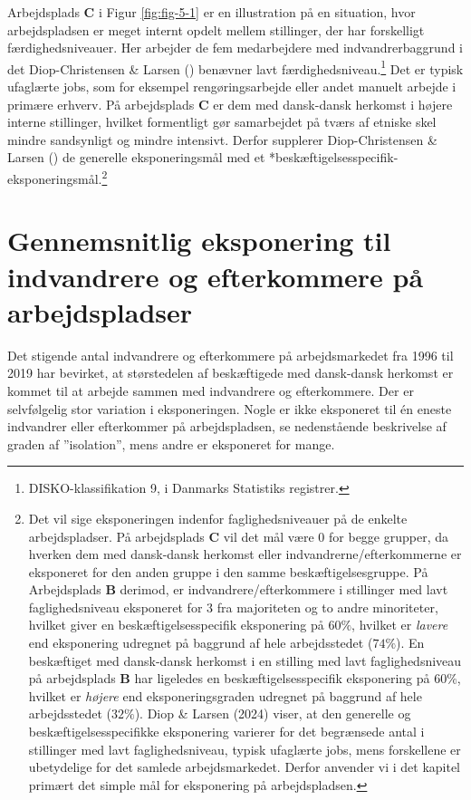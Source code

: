 \documentclass[
]{book}
\begin{document}
Arbejdsplads \textbf{C} i Figur \ref{fig:fig-5-1} er en illustration på en situation, hvor arbejdspladsen er meget internt opdelt mellem stillinger, der har forskelligt færdighedsniveauer. Her arbejder de fem medarbejdere med indvandrerbaggrund i det Diop-Christensen \& Larsen () benævner lavt færdighedsniveau.\footnote{DISKO-klassifikation 9, i Danmarks Statistiks registrer.} Det er typisk ufaglærte jobs, som for eksempel rengøringsarbejde eller andet manuelt arbejde i primære erhverv. På arbejdsplads \textbf{C} er dem med dansk-dansk herkomst i højere interne stillinger, hvilket formentligt gør samarbejdet på tværs af etniske skel mindre sandsynligt og mindre intensivt. Derfor supplerer Diop-Christensen \& Larsen () de generelle eksponeringsmål med et *beskæftigelsesspecifik-eksponeringsmål.\footnote{Det vil sige eksponeringen indenfor faglighedsniveauer på de enkelte arbejdspladser. På arbejdsplads \textbf{C} vil det mål være \(0\) for begge grupper, da hverken dem med dansk-dansk herkomst eller indvandrerne/efterkommerne er eksponeret for den anden gruppe i den samme beskæftigelsesgruppe. På Arbejdsplads \textbf{B} derimod, er indvandrere/efterkommere i stillinger med lavt faglighedsniveau eksponeret for \(3\) fra majoriteten og to andre minoriteter, hvilket giver en beskæftigelsesspecifik eksponering på \(60\%\), hvilket er \emph{lavere} end eksponering udregnet på baggrund af hele arbejdsstedet (\(74\%\)). En beskæftiget med dansk-dansk herkomst i en stilling med lavt faglighedsniveau på arbejdsplads \textbf{B} har ligeledes en beskæftigelsesspecifik eksponering på \(60\%\), hvilket er \emph{højere} end eksponeringsgraden udregnet på baggrund af hele arbejdsstedet (\(32\%\)). Diop \& Larsen (2024) viser, at den generelle og beskæftigelsesspecifikke eksponering varierer for det begrænsede antal i stillinger med lavt faglighedsniveau, typisk ufaglærte jobs, mens forskellene er ubetydelige for det samlede arbejdsmarkedet. Derfor anvender vi i det kapitel primært det simple mål for eksponering på arbejdspladsen.}

\section{Gennemsnitlig eksponering til indvandrere og efterkommere på arbejdspladser}\label{gennemsnitlig-eksponering-til-indvandrere-og-efterkommere-puxe5-arbejdspladser}

Det stigende antal indvandrere og efterkommere på arbejdsmarkedet fra 1996 til 2019 har bevirket, at størstedelen af beskæftigede med dansk-dansk herkomst er kommet til at arbejde sammen med indvandrere og efterkommere. Der er selvfølgelig stor variation i eksponeringen. Nogle er ikke eksponeret til én eneste indvandrer eller efterkommer på arbejdspladsen, se nedenstående beskrivelse af graden af ''isolation'', mens andre er eksponeret for mange.
\end{document}
